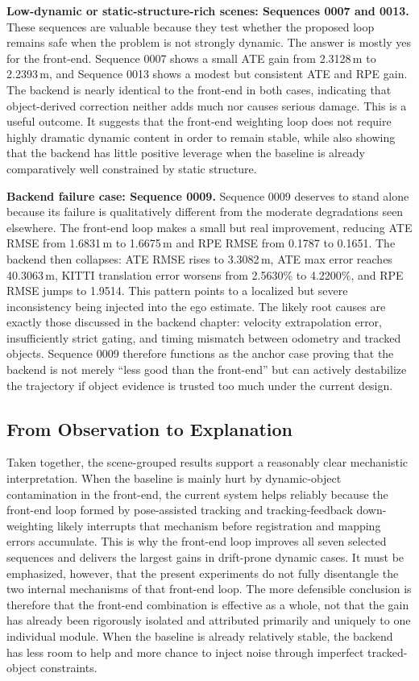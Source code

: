 \documentclass[a4paper,12pt]{article}
\begin{document}
\textbf{Low-dynamic or static-structure-rich scenes: Sequences 0007 and 0013.} These sequences are valuable because they test whether the proposed loop remains safe when the problem is not strongly dynamic. The answer is mostly yes for the front-end. Sequence 0007 shows a small ATE gain from 2.3128\,m to 2.2393\,m, and Sequence 0013 shows a modest but consistent ATE and RPE gain. The backend is nearly identical to the front-end in both cases, indicating that object-derived correction neither adds much nor causes serious damage. This is a useful outcome. It suggests that the front-end weighting loop does not require highly dramatic dynamic content in order to remain stable, while also showing that the backend has little positive leverage when the baseline is already comparatively well constrained by static structure.

\textbf{Backend failure case: Sequence 0009.} Sequence 0009 deserves to stand alone because its failure is qualitatively different from the moderate degradations seen elsewhere. The front-end loop makes a small but real improvement, reducing ATE RMSE from 1.6831\,m to 1.6675\,m and RPE RMSE from 0.1787 to 0.1651. The backend then collapses: ATE RMSE rises to 3.3082\,m, ATE max error reaches 40.3063\,m, KITTI translation error worsens from 2.5630\% to 4.2200\%, and RPE RMSE jumps to 1.9514. This pattern points to a localized but severe inconsistency being injected into the ego estimate. The likely root causes are exactly those discussed in the backend chapter: velocity extrapolation error, insufficiently strict gating, and timing mismatch between odometry and tracked objects. Sequence 0009 therefore functions as the anchor case proving that the backend is not merely ``less good than the front-end'' but can actively destabilize the trajectory if object evidence is trusted too much under the current design.

\subsection{From Observation to Explanation}
Taken together, the scene-grouped results support a reasonably clear mechanistic interpretation. When the baseline is mainly hurt by dynamic-object contamination in the front-end, the current system helps reliably because the front-end loop formed by pose-assisted tracking and tracking-feedback down-weighting likely interrupts that mechanism before registration and mapping errors accumulate. This is why the front-end loop improves all seven selected sequences and delivers the largest gains in drift-prone dynamic cases. It must be emphasized, however, that the present experiments do not fully disentangle the two internal mechanisms of that front-end loop. The more defensible conclusion is therefore that the front-end combination is effective as a whole, not that the gain has already been rigorously isolated and attributed primarily and uniquely to one individual module. When the baseline is already relatively stable, the backend has less room to help and more chance to inject noise through imperfect tracked-object constraints.
\end{document}
